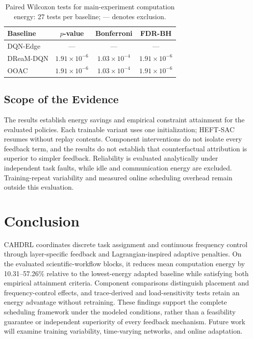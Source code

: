 \documentclass[journal]{IEEEtran}
\begin{document}
\begin{table}[!htb]
\centering
\caption{Paired Wilcoxon tests for main-experiment computation
energy: 27 tests per baseline; --- denotes exclusion.}
\label{tab:main_wilcoxon}
\footnotesize
\setlength{\tabcolsep}{3pt}
\renewcommand{\arraystretch}{1.08}
\begin{tabular*}{\columnwidth}{@{\extracolsep{\fill}}lccc@{}}
\toprule
Baseline & $p$-value & Bonferroni & FDR-BH \\
\midrule
DQN-Edge & --- & --- & --- \\
DReaM-DQN & $1.91\times10^{-6}$ & $1.03\times10^{-4}$ & $1.91\times10^{-6}$ \\
OOAC & $1.91\times10^{-6}$ & $1.03\times10^{-4}$ & $1.91\times10^{-6}$ \\
\bottomrule
\end{tabular*}
\end{table}

\subsection{Scope of the Evidence}
The results establish energy savings and empirical constraint attainment for the evaluated policies. Each trainable variant uses one initialization; HEFT-SAC resumes without replay contents. Component interventions do not isolate every feedback term, and the results do not establish that counterfactual attribution is superior to simpler feedback. Reliability is evaluated analytically under independent task faults, while idle and communication energy are excluded. Training-repeat variability and measured online scheduling overhead remain outside this evaluation.

\section{Conclusion}
\label{sec:conclusion}
CAHDRL coordinates discrete task assignment and continuous frequency control through layer-specific feedback and Lagrangian-inspired adaptive penalties. On the evaluated scientific-workflow blocks, it reduces mean computation energy by 10.31--57.26\% relative to the lowest-energy adapted baseline while satisfying both empirical attainment criteria. Component comparisons distinguish placement and frequency-control effects, and trace-derived and load-sensitivity tests retain an energy advantage without retraining. These findings support the complete scheduling framework under the modeled conditions, rather than a feasibility guarantee or independent superiority of every feedback mechanism. Future work will examine training variability, time-varying networks, and online adaptation.


\end{document}
